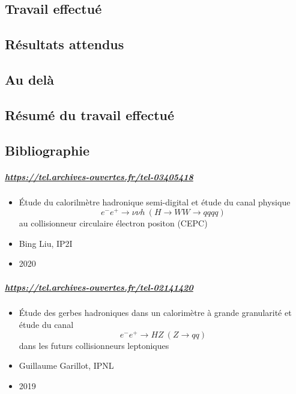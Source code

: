 \documentclass[10pt,a4paper]{report}
\newcommand{\electron}{e^{+}}
\newcommand{\positron}{e^{-}}
\newcommand{\nnh}{\nu \nu h}
\begin{document}
\section{Travail effectué}

\section{Résultats attendus}

\section{Au delà}


\begin{appendix}


\chapter{Résumé du travail effectué}

\section{Bibliographie}

\paragraph{\url{https://tel.archives-ouvertes.fr/tel-03405418}}
\begin{itemize}
	\item Étude du calorilmètre hadronique semi-digital et étude du canal physique 
	$$ \positron \electron \longrightarrow \nnh \ (H \longrightarrow WW \longrightarrow qqqq)$$ 
	au collisionneur circulaire électron positon (CEPC) 
	\item Bing Liu, IP2I
	\item 2020
\end{itemize}

\paragraph{\url{https://tel.archives-ouvertes.fr/tel-02141420}}
\begin{itemize}
	\item Étude des gerbes hadroniques dans un calorimètre à grande granularité et étude du canal $$ \positron \electron \longrightarrow HZ \ (Z \longrightarrow qq) $$ dans les futurs collisionneurs leptoniques
	\item Guillaume Garillot, IPNL
	\item 2019
\end{itemize}


\end{appendix}
\end{document}
